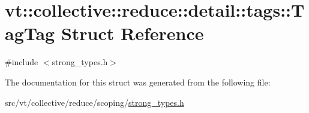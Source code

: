 \hypertarget{structvt_1_1collective_1_1reduce_1_1detail_1_1tags_1_1_tag_tag}{}\section{vt\+:\+:collective\+:\+:reduce\+:\+:detail\+:\+:tags\+:\+:Tag\+Tag Struct Reference}
\label{structvt_1_1collective_1_1reduce_1_1detail_1_1tags_1_1_tag_tag}


{\ttfamily \#include $<$strong\+\_\+types.\+h$>$}



The documentation for this struct was generated from the following file\+:\begin{DoxyCompactItemize}
\item 
src/vt/collective/reduce/scoping/\hyperlink{strong__types_8h}{strong\+\_\+types.\+h}\end{DoxyCompactItemize}
